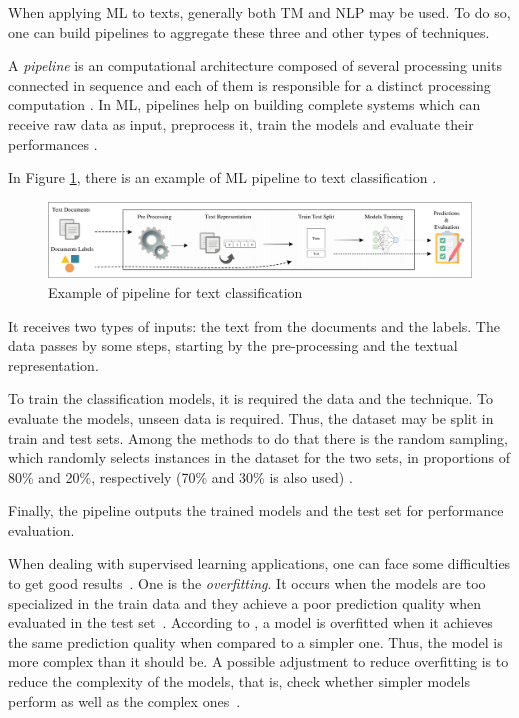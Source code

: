 When applying \gls{ML} to texts, generally both \gls{TM} and \gls{NLP} may be used. To do so, one can build pipelines to aggregate these three and other types of techniques.

A \textit{pipeline} is an computational architecture composed of several processing units connected in sequence and each of them is responsible for a distinct processing computation \cite{Ramamoorthy1977}. 
In \gls{ML}, pipelines help on building complete systems which can receive raw data as input, preprocess it, train the models and evaluate their performances \cite{OBrien2021}.

In Figure \ref{fig:cap2_example_pipeline}, there is an example of \gls{ML} pipeline to text classification \cite{Kowsari2019}. 

\begin{figure}[htb]
    \centering
    \caption{Example of pipeline for text classification}
    \label{fig:cap2_example_pipeline}
    \includegraphics[width=\textwidth]{images/chapters/cap4_simple_pipeline_regression.pdf}
\end{figure}

It receives two types of inputs: the text from the documents and the labels. The data passes by some steps, starting by the pre-processing and the textual representation. 

To train the classification models, it is required the data and the technique. To evaluate the models, unseen data is required. Thus, the dataset may be split in train and test sets. Among the methods to do that there is the random sampling, which randomly selects instances in the dataset for the two sets, in proportions of 80\% and 20\%, respectively (70\% and 30\% is also used) \cite{Kotu2019}. 

Finally, the pipeline outputs the trained models and the test set for performance evaluation.


When dealing with supervised learning applications, one can face some difficulties to get good results~\cite{Alzubaidi2021,Kornilova2021}. 
One is the \textit{overfitting}. It occurs when the models are too specialized in the train data and they achieve a poor prediction quality when evaluated in the test set~\cite{Karystinos2000}. 
According to \textcite{Hawkins2004}, a model is overfitted when it achieves the same prediction quality when compared to a simpler one. Thus, the model is more complex than it should be. A possible adjustment to reduce overfitting is to reduce the complexity of the models, that is, check whether simpler models perform as well as the complex ones~\cite{Liu2016}. 

